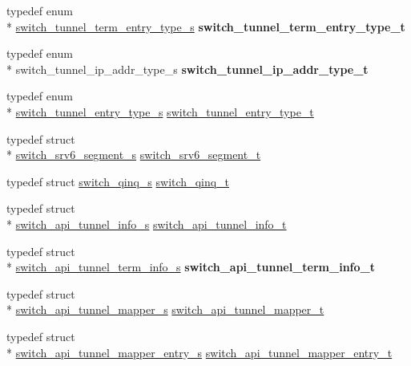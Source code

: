 \begin{DoxyCompactItemize}
\item 
\hypertarget{group__Tunnel_gad4322baf90307dfbca395e5e7fa44de5}{typedef enum \\*
\hyperlink{group__Tunnel_gaf17d995b62e3e95fc88052f69156317d}{switch\+\_\+tunnel\+\_\+term\+\_\+entry\+\_\+type\+\_\+s} {\bfseries switch\+\_\+tunnel\+\_\+term\+\_\+entry\+\_\+type\+\_\+t}}\label{group__Tunnel_gad4322baf90307dfbca395e5e7fa44de5}

\item 
\hypertarget{group__Tunnel_ga50eba8f8a87d82d4e555543ac632064f}{typedef enum \\*
switch\+\_\+tunnel\+\_\+ip\+\_\+addr\+\_\+type\+\_\+s {\bfseries switch\+\_\+tunnel\+\_\+ip\+\_\+addr\+\_\+type\+\_\+t}}\label{group__Tunnel_ga50eba8f8a87d82d4e555543ac632064f}

\item 
typedef enum \\*
\hyperlink{group__Tunnel_gaa171c0101a1f87af3f4cc2d44343e4a0}{switch\+\_\+tunnel\+\_\+entry\+\_\+type\+\_\+s} \hyperlink{group__Tunnel_ga8c691aa3424f01425814cccd5c076e44}{switch\+\_\+tunnel\+\_\+entry\+\_\+type\+\_\+t}
\item 
typedef struct \\*
\hyperlink{structswitch__srv6__segment__s}{switch\+\_\+srv6\+\_\+segment\+\_\+s} \hyperlink{group__Tunnel_ga58531f8a8bab6f7c34f9bd77c243ec2f}{switch\+\_\+srv6\+\_\+segment\+\_\+t}
\item 
typedef struct \hyperlink{structswitch__qinq__s}{switch\+\_\+qinq\+\_\+s} \hyperlink{group__Tunnel_gaf7119659216df7efc9b7453d85ab2451}{switch\+\_\+qinq\+\_\+t}
\item 
typedef struct \\*
\hyperlink{structswitch__api__tunnel__info__s}{switch\+\_\+api\+\_\+tunnel\+\_\+info\+\_\+s} \hyperlink{group__Tunnel_ga9c4faabdbd4426a0e9903279ad118116}{switch\+\_\+api\+\_\+tunnel\+\_\+info\+\_\+t}
\item 
\hypertarget{group__Tunnel_ga446d83c7ebbbfbce496227a6474744f3}{typedef struct \\*
\hyperlink{structswitch__api__tunnel__term__info__s}{switch\+\_\+api\+\_\+tunnel\+\_\+term\+\_\+info\+\_\+s} {\bfseries switch\+\_\+api\+\_\+tunnel\+\_\+term\+\_\+info\+\_\+t}}\label{group__Tunnel_ga446d83c7ebbbfbce496227a6474744f3}

\item 
typedef struct \\*
\hyperlink{structswitch__api__tunnel__mapper__s}{switch\+\_\+api\+\_\+tunnel\+\_\+mapper\+\_\+s} \hyperlink{group__Tunnel_gabce2bf13973701d284cb4c173ee4d9d7}{switch\+\_\+api\+\_\+tunnel\+\_\+mapper\+\_\+t}
\item 
typedef struct \\*
\hyperlink{structswitch__api__tunnel__mapper__entry__s}{switch\+\_\+api\+\_\+tunnel\+\_\+mapper\+\_\+entry\+\_\+s} \hyperlink{group__Tunnel_gadb6058730695240a36e37a65dbc20e8b}{switch\+\_\+api\+\_\+tunnel\+\_\+mapper\+\_\+entry\+\_\+t}
\end{DoxyCompactItemize}
